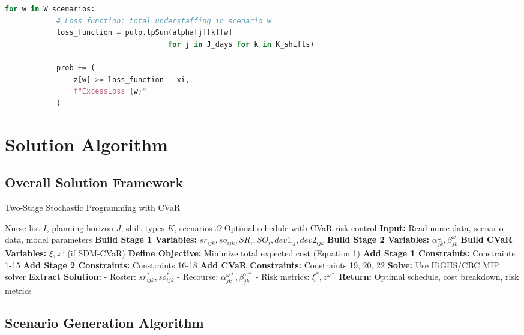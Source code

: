 \documentclass[12pt,a4paper]{article}
\begin{document}
\begin{lstlisting}[language=Python, caption=Constraint 22 Implementation (model.py:L1181)]
        for w in W_scenarios:
            # Loss function: total understaffing in scenario w
            loss_function = pulp.lpSum(alpha[j][k][w] 
                                      for j in J_days for k in K_shifts)
            
            prob += (
                z[w] >= loss_function - xi,
                f"ExcessLoss_{w}"
            )
\end{lstlisting}

\newpage

\section{Solution Algorithm}

\subsection{Overall Solution Framework}

\begin{algorithm}[H]
\caption{Two-Stage Stochastic Programming with CVaR}
\begin{algorithmic}[1]
\Require Nurse list $I$, planning horizon $J$, shift types $K$, scenarios $\Omega$
\Ensure Optimal schedule with CVaR risk control
\State \textbf{Input:} Read nurse data, scenario data, model parameters
\State \textbf{Build Stage 1 Variables:} $sr_{ijk}, so_{ijk}, SR_i, SO_i, dev1_{ij}, dev2_{ijk}$
\State \textbf{Build Stage 2 Variables:} $\alpha_{jk}^\omega, \beta_{jk}^\omega$
\State \textbf{Build CVaR Variables:} $\xi, z^\omega$ (if SDM-CVaR)
\State \textbf{Define Objective:} Minimize total expected cost (Equation 1)
\State \textbf{Add Stage 1 Constraints:} Constraints 1-15
\State \textbf{Add Stage 2 Constraints:} Constraints 16-18
    \State \textbf{Add CVaR Constraints:} Constraints 19, 20, 22
\EndIf
\State \textbf{Solve:} Use HiGHS/CBC MIP solver
\State \textbf{Extract Solution:} 
\State \quad - Roster: $sr_{ijk}^*, so_{ijk}^*$
\State \quad - Recourse: $\alpha_{jk}^{\omega*}, \beta_{jk}^{\omega*}$
\State \quad - Risk metrics: $\xi^*, z^{\omega*}$
\State \textbf{Return:} Optimal schedule, cost breakdown, risk metrics
\end{algorithmic}
\end{algorithm}

\subsection{Scenario Generation Algorithm}
\end{document}
